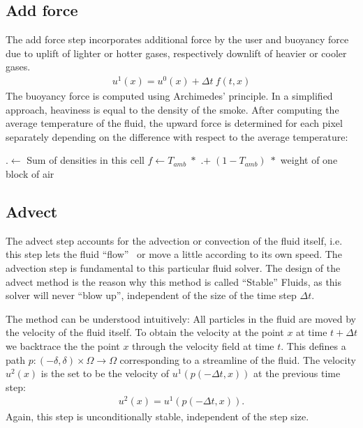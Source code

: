 \documentclass[a4paper,10pt,oneside,final,german,openbib,pdftex,titlepage]{scrbook}
\begin{document}
\subsection{Add force}
The add force step incorporates additional force by the user and buoyancy force due to uplift of lighter or hotter gases, respectively downlift of heavier or cooler gases.
\begin{align*}
	u^1(x) = u^0(x) + \Delta t~ f(t,x)
\end{align*}
The buoyancy force is computed using Archimedes' principle. In a simplified approach, heaviness is equal to the density of the smoke. After computing the average temperature of the fluid, the upward force is determined for each pixel separately depending on the difference with respect to the average temperature:
\begin{algorithm}
\DontPrintSemicolon
{
	\cell.\weight $\leftarrow$ Sum of densities in this cell\;
	$f\leftarrow T_{amb} \;*$ \cell.\weight $ +\; (1-T_{amb}) \;* $ weight of one block of air\;
}
\end{algorithm}

\subsection{Advect}
The advect step accounts for the advection or convection of the fluid itself, i.e. this step lets the fluid ``flow'' ~or move a little according to its own speed.
The advection step is fundamental to this particular fluid solver. The design of the advect method is the reason why this method is called ``Stable'' Fluids, as this solver will never ``blow up'', independent of the size of the time step $\Delta t$. 

The method can be understood intuitively: All particles in the fluid are moved by the velocity of the fluid itself. To obtain the velocity at the point $x$ at time $t + \Delta t$ we backtrace the the point $x$ through the velocity field at time $t$. This defines a path $p: (-\delta,\delta) \times \Omega \rightarrow \Omega$ corresponding to a streamline of the fluid. The velocity $u^2(x)$ is the set to be the velocity of $u^1(p(-\Delta t,x))$ at the previous time step:
\begin{align*}
	u^2(x) = u^1(p(-\Delta t,x)).
\end{align*}
Again, this step is unconditionally stable, independent of the step size.\\
\end{document}
